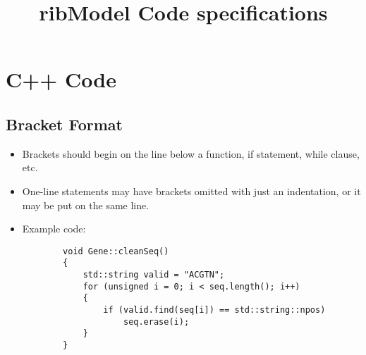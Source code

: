 \documentclass[letter,10pt]{article}
\title{ribModel Code specifications}
\begin{document}
\maketitle
\newpage
\tableofcontents
\newpage

\section{C++ Code}

\subsection{Bracket Format}
\begin{itemize}
    \item Brackets should begin on the line below a function, if statement, while clause, etc.
    \item
    One-line statements may have brackets omitted with just an indentation, or it may
    be put on the same line.
    \item Example code:
    \begin{lstlisting}
        void Gene::cleanSeq()
        {
            std::string valid = "ACGTN";
            for (unsigned i = 0; i < seq.length(); i++)
            {
                if (valid.find(seq[i]) == std::string::npos)
                    seq.erase(i);
            }
        }
    \end{lstlisting}
\end{itemize}
\end{document}
